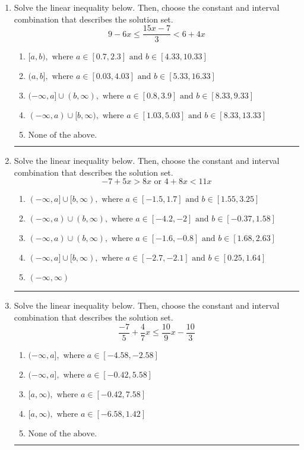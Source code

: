 \documentclass[14pt]{extbook}
\newcommand{\litem}[1]{\item#1\hspace*{-1cm}\rule{\textwidth}{0.4pt}}
\begin{document}
\begin{enumerate}
{\begin{enumerate}[label=\Alph*.]
\end{enumerate} }
\litem{
Solve the linear inequality below. Then, choose the constant and interval combination that describes the solution set.\[ 9 - 6 x \leq \frac{15 x - 7}{3} < 6 + 4 x \]\begin{enumerate}[label=\Alph*.]
\item \( [a, b), \text{ where } a \in [0.7, 2.3] \text{ and } b \in [4.33, 10.33] \)
\item \( (a, b], \text{ where } a \in [0.03, 4.03] \text{ and } b \in [5.33, 16.33] \)
\item \( (-\infty, a] \cup (b, \infty), \text{ where } a \in [0.8, 3.9] \text{ and } b \in [8.33, 9.33] \)
\item \( (-\infty, a) \cup [b, \infty), \text{ where } a \in [1.03, 5.03] \text{ and } b \in [8.33, 13.33] \)
\item \( \text{None of the above.} \)

\end{enumerate} }
\litem{
Solve the linear inequality below. Then, choose the constant and interval combination that describes the solution set.\[ -7 + 5 x > 8 x \text{ or } 4 + 8 x < 11 x \]\begin{enumerate}[label=\Alph*.]
\item \( (-\infty, a] \cup [b, \infty), \text{ where } a \in [-1.5, 1.7] \text{ and } b \in [1.55, 3.25] \)
\item \( (-\infty, a) \cup (b, \infty), \text{ where } a \in [-4.2, -2] \text{ and } b \in [-0.37, 1.58] \)
\item \( (-\infty, a) \cup (b, \infty), \text{ where } a \in [-1.6, -0.8] \text{ and } b \in [1.68, 2.63] \)
\item \( (-\infty, a] \cup [b, \infty), \text{ where } a \in [-2.7, -2.1] \text{ and } b \in [0.25, 1.64] \)
\item \( (-\infty, \infty) \)

\end{enumerate} }
\litem{
Solve the linear inequality below. Then, choose the constant and interval combination that describes the solution set.\[ \frac{-7}{5} + \frac{4}{7} x \leq \frac{10}{9} x - \frac{10}{3} \]\begin{enumerate}[label=\Alph*.]
\item \( (-\infty, a], \text{ where } a \in [-4.58, -2.58] \)
\item \( (-\infty, a], \text{ where } a \in [-0.42, 5.58] \)
\item \( [a, \infty), \text{ where } a \in [-0.42, 7.58] \)
\item \( [a, \infty), \text{ where } a \in [-6.58, 1.42] \)
\item \( \text{None of the above}. \)

\end{enumerate} }
\end{enumerate}
\end{document}
